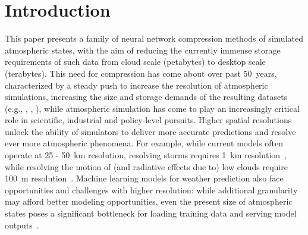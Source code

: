 \section{Introduction}
\label{sx:introduction}

This paper presents a family of neural network compression methods of simulated atmospheric states, with the aim of reducing the currently immense storage requirements of such data from cloud scale (petabytes) to desktop scale (terabytes). 
%
This need for compression has come about over past 50~years, characterized by a steady push to increase the resolution of atmospheric simulations, increasing the size and storage demands of the resulting datasets (e.g., \citet{neumann2019assessing}, \citet{schneider2023harnessing}, \citet{essd-16-2113-2024}), while atmospheric simulation has come to play an increasingly critical role in scientific, industrial and policy-level pursuits.
Higher spatial resolutions unlock the ability of simulators to deliver more accurate predictions and resolve ever more atmospheric phenomena.
For example, while current models often operate at 25 - 50~km resolution, resolving storms requires 1~km resolution~\citep{stevens2020added}, while resolving the motion of (and radiative effects due to) low clouds require 100~m resolution~\citep{schneider2017earth,satoh2019global}.
Machine learning models for weather prediction also face opportunities and challenges with higher resolution: while additional granularity may afford better modeling opportunities, even the present size of atmospheric states poses a significant bottleneck for loading training data and serving model outputs~\citep{chantry2021opportunities}.

